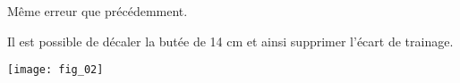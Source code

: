 \ifprof \begin{corrige}
Même erreur que précédemment.
\end{corrige} \else \fi


\ifprof \begin{corrige}
Il est possible de décaler la butée de 14 cm et ainsi supprimer l'écart de trainage.
\end{corrige} \else \fi


\ifprof
\else
\begin{center}
\texttt{[image: fig\_02]}
\end{center}
\fi
